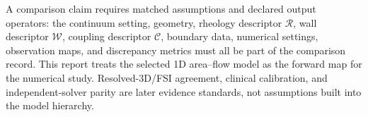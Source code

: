 





A comparison claim requires matched assumptions and declared output operators:
the continuum setting, geometry, rheology descriptor $\mathcal R$, wall
descriptor $\mathcal W$, coupling descriptor $\mathcal C$, boundary data,
numerical settings, observation maps, and discrepancy metrics must all be part
of the comparison record. This report treats the selected 1D area--flow model
as the forward map for the numerical study. Resolved-3D/FSI agreement, clinical
calibration, and independent-solver parity are later evidence standards, not
assumptions built into the model hierarchy.
